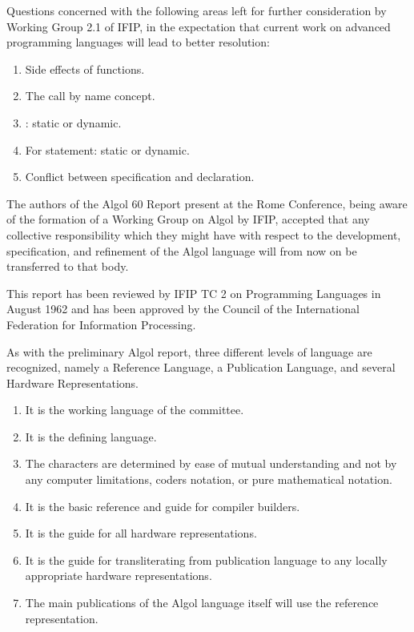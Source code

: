 \documentclass[a4paper,11pt]{article}
\begin{document}
Questions concerned with the following areas left for further consideration by
Working Group 2.1 of IFIP, in the expectation that current
work on advanced programming languages will lead to
better resolution:

\begin{enumerate}

\item Side effects of functions.

\item The call by name concept.

\item {}: static or dynamic.

\item For statement: static or dynamic.

\item Conflict between specification and declaration.

\end{enumerate}

The authors of the Algol 60 Report present at the Rome Conference,
being aware of the formation of a Working Group on Algol by IFIP,
accepted that any collective responsibility which they might have with respect to the development, specification, and refinement of the Algol language
will from now on be transferred to that body.

This report has been reviewed by IFIP TC 2 on Programming Languages in August 1962 and
has been approved by the Council of the International Federation for
Information Processing.

As with the preliminary Algol report, three different levels of language
are recognized, namely a Reference Language, a Publication Language, and
several Hardware Representations. 



\begin{enumerate}

\item It is the working language of the committee.

\item It is the defining language.

\item The characters are determined by ease of mutual understanding and
      not by any computer limitations, coders notation, or pure
      mathematical notation.

\item It is the basic reference and guide for compiler builders.

\item It is the guide for all hardware representations.

\item It is the guide for transliterating from publication language to
      any locally appropriate hardware representations.

\item The main publications of the Algol language itself will use the
      reference representation.
\end{enumerate}
\end{document}
